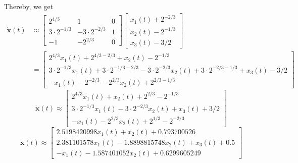 Thereby, we get
\begin{align*}
    \mathbf{\dot x}(t)
     & \approx
    \begin{bmatrix}
        2^{4/3}         & 1                & 0 \\
        3\cdot 2^{-1/3} & -3\cdot 2^{-2/3} & 1 \\
        -1              & -2^{2/3}         & 0
    \end{bmatrix}
    \begin{bmatrix}
        x_1(t) + 2^{-2/3} \\
        x_2(t) - 2^{-1/3} \\
        x_3(t) - 3/2
    \end{bmatrix} \\
     & =
    \begin{bmatrix}
        2^{4/3}x_1(t) + 2^{4/3-2/3} + x_2(t) - 2^{-1/3}                                                          \\
        3\cdot 2^{-1/3}x_1(t) + 3\cdot 2^{-1/3-2/3} - 3\cdot 2^{-2/3}x_2(t) + 3\cdot 2^{-2/3-1/3} + x_3(t) - 3/2 \\
        -x_1(t) - 2^{-2/3} - 2^{2/3}x_2(t) + 2^{2/3-1/3}
    \end{bmatrix}
\end{align*}
\[
    \boxed{
        \mathbf{\dot x}(t) \approx
        \begin{bmatrix}
            2^{4/3}x_1(t) + x_2(t) + 2^{2/3} - 2^{-1/3}                  \\
            3\cdot 2^{-1/3}x_1(t) - 3\cdot 2^{-2/3}x_2(t) + x_3(t) + 3/2 \\
            -x_1(t) - 2^{2/3}x_2(t) + 2^{1/3} - 2^{-2/3}
        \end{bmatrix}
    }
\]
\[
    \mathbf{\dot x}(t) \approx
    \begin{bmatrix}
        2.5198420998 x_1(t) + x_2(t) + 0.793700526              \\
        2.381101578 x_1(t) - 1.8898815748 x_2(t) + x_3(t) + 0.5 \\
        -x_1(t) - 1.587401052 x_2(t) + 0.6299605249
    \end{bmatrix}
\]
